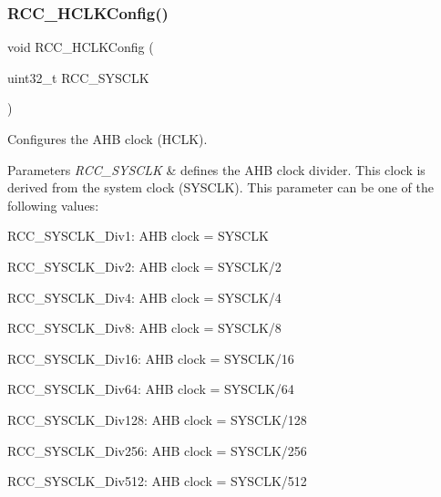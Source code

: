 \mbox{\label{group___r_c_c___exported___functions_ga9d0aec72e236c6cdf3a3a82dfb525491}} 
\subsubsection{\texorpdfstring{R\+C\+C\+\_\+\+H\+C\+L\+K\+Config()}{RCC\_HCLKConfig()}}
{\footnotesize\ttfamily void R\+C\+C\+\_\+\+H\+C\+L\+K\+Config (\begin{DoxyParamCaption}\item[{uint32\+\_\+t}]{R\+C\+C\+\_\+\+S\+Y\+S\+C\+LK }\end{DoxyParamCaption})}



Configures the A\+HB clock (H\+C\+LK). 


\begin{DoxyParams}{Parameters}
{\em R\+C\+C\+\_\+\+S\+Y\+S\+C\+LK} & defines the A\+HB clock divider. This clock is derived from the system clock (S\+Y\+S\+C\+LK). This parameter can be one of the following values\+: \begin{DoxyItemize}
\item R\+C\+C\+\_\+\+S\+Y\+S\+C\+L\+K\+\_\+\+Div1\+: A\+HB clock = S\+Y\+S\+C\+LK \item R\+C\+C\+\_\+\+S\+Y\+S\+C\+L\+K\+\_\+\+Div2\+: A\+HB clock = S\+Y\+S\+C\+L\+K/2 \item R\+C\+C\+\_\+\+S\+Y\+S\+C\+L\+K\+\_\+\+Div4\+: A\+HB clock = S\+Y\+S\+C\+L\+K/4 \item R\+C\+C\+\_\+\+S\+Y\+S\+C\+L\+K\+\_\+\+Div8\+: A\+HB clock = S\+Y\+S\+C\+L\+K/8 \item R\+C\+C\+\_\+\+S\+Y\+S\+C\+L\+K\+\_\+\+Div16\+: A\+HB clock = S\+Y\+S\+C\+L\+K/16 \item R\+C\+C\+\_\+\+S\+Y\+S\+C\+L\+K\+\_\+\+Div64\+: A\+HB clock = S\+Y\+S\+C\+L\+K/64 \item R\+C\+C\+\_\+\+S\+Y\+S\+C\+L\+K\+\_\+\+Div128\+: A\+HB clock = S\+Y\+S\+C\+L\+K/128 \item R\+C\+C\+\_\+\+S\+Y\+S\+C\+L\+K\+\_\+\+Div256\+: A\+HB clock = S\+Y\+S\+C\+L\+K/256 \item R\+C\+C\+\_\+\+S\+Y\+S\+C\+L\+K\+\_\+\+Div512\+: A\+HB clock = S\+Y\+S\+C\+L\+K/512 \end{DoxyItemize}
\\
\hline
\end{DoxyParams}

